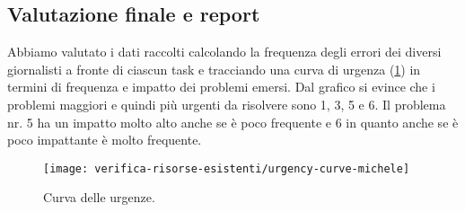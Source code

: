 \subsection{Valutazione finale e report}
Abbiamo valutato i dati raccolti calcolando la frequenza degli errori dei diversi giornalisti a fronte di ciascun task e tracciando una curva di urgenza (\ref{fig:urgency-curves}) in termini di frequenza e impatto dei problemi emersi.
Dal grafico  si evince che i problemi maggiori e quindi più urgenti da risolvere sono 1, 3, 5 e 6. Il problema nr. 5 ha un impatto molto alto anche se è poco frequente e  6 in quanto anche se è poco impattante è molto frequente.

\begin{figure}[H]
    \centering
    \texttt{[image: verifica-risorse-esistenti/urgency-curve-michele]}
    \caption{Curva delle urgenze.}
    \label{fig:urgency-curves}
\end{figure}
